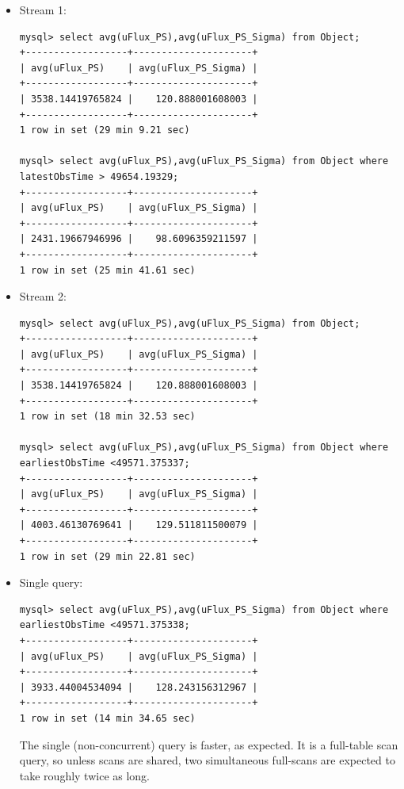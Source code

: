 \documentclass[DM,toc]{lsstdoc}
\begin{document}
\begin{itemize}
\item
  Stream 1:

\begin{verbatim}
mysql> select avg(uFlux_PS),avg(uFlux_PS_Sigma) from Object;
+------------------+---------------------+
| avg(uFlux_PS)    | avg(uFlux_PS_Sigma) |
+------------------+---------------------+
| 3538.14419765824 |    120.888001608003 |
+------------------+---------------------+
1 row in set (29 min 9.21 sec)

mysql> select avg(uFlux_PS),avg(uFlux_PS_Sigma) from Object where latestObsTime > 49654.19329;
+------------------+---------------------+
| avg(uFlux_PS)    | avg(uFlux_PS_Sigma) |
+------------------+---------------------+
| 2431.19667946996 |    98.6096359211597 |
+------------------+---------------------+
1 row in set (25 min 41.61 sec)
\end{verbatim}

\item
  Stream 2:

\begin{verbatim}
mysql> select avg(uFlux_PS),avg(uFlux_PS_Sigma) from Object;
+------------------+---------------------+
| avg(uFlux_PS)    | avg(uFlux_PS_Sigma) |
+------------------+---------------------+
| 3538.14419765824 |    120.888001608003 |
+------------------+---------------------+
1 row in set (18 min 32.53 sec)

mysql> select avg(uFlux_PS),avg(uFlux_PS_Sigma) from Object where earliestObsTime <49571.375337;
+------------------+---------------------+
| avg(uFlux_PS)    | avg(uFlux_PS_Sigma) |
+------------------+---------------------+
| 4003.46130769641 |    129.511811500079 |
+------------------+---------------------+
1 row in set (29 min 22.81 sec)
\end{verbatim}

\item
  Single query:

\begin{verbatim}
mysql> select avg(uFlux_PS),avg(uFlux_PS_Sigma) from Object where earliestObsTime <49571.375338;
+------------------+---------------------+
| avg(uFlux_PS)    | avg(uFlux_PS_Sigma) |
+------------------+---------------------+
| 3933.44004534094 |    128.243156312967 |
+------------------+---------------------+
1 row in set (14 min 34.65 sec)
\end{verbatim}

The single (non-concurrent) query is faster, as expected. It is a
full-table scan query, so unless scans are shared, two simultaneous
full-scans are expected to take roughly twice as long.
\end{itemize}
\end{document}
